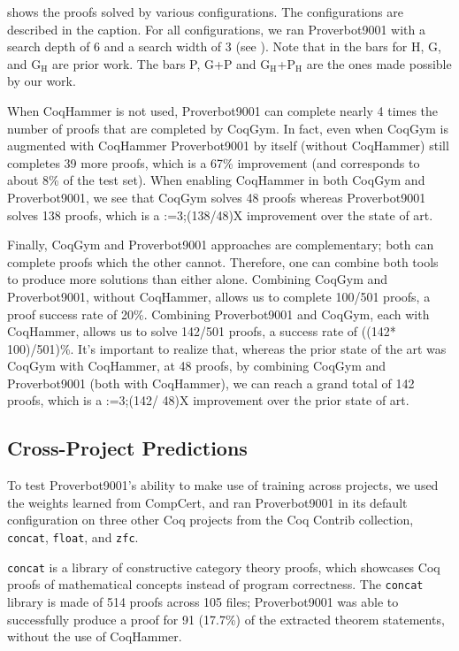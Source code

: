 \documentclass[sigplan,screen]{acmart}
\newcommand{\name}{Proverbot9001\xspace}
\newcommand{\PH}{138}
\newcommand{\CHCP}{142}
\renewcommand{\>}{\quad}
\begin{document}
 shows the proofs solved by various configurations.
The configurations are described in the caption.
For all configurations,
  we ran \name{} with a search depth of 6 and a search width of 3
  (see ).
Note that in  the bars for H, G, and $\text{G}_\text{H}$ are prior work.
The bars P, G+P and $\text{G}_\text{H}$+$\text{P}_\text{H}$
  are the ones made possible by our work.

When CoqHammer is not used, \name{} can complete nearly 4 times the number of proofs
  that are completed by CoqGym.
In fact, even when CoqGym is augmented with CoqHammer
  \name{} by itself (without CoqHammer) still completes 39 more proofs,
  which is a 67\% improvement (and corresponds to about 8\% of the test set).
When enabling CoqHammer in both CoqGym and \name{}, we see that CoqGym solves 48 proofs whereas \name{} solves \PH{} proofs, which is a \xintDigits:=3;\xintthefloatexpr(\PH/48)\relax X improvement over the state of art.

Finally, CoqGym and \name{} approaches are complementary;
  both can complete proofs which the other cannot.
Therefore, one can combine both tools to produce
  more solutions than either alone.
Combining CoqGym and \name{}, without CoqHammer, allows us to complete 100/501 proofs,
  a proof success rate of 20\%.
Combining \name{} and CoqGym, each with CoqHammer,
  allows us to solve \CHCP{}/501 proofs, a success rate of \number\numexpr((\CHCP * 100)/501)\relax\%.
It's important to realize that,
  whereas the prior state of the art was CoqGym with CoqHammer, at 48 proofs,
  by combining CoqGym and \name{} (both with CoqHammer),
  we can reach a grand total of \CHCP\xspace proofs,
  which is a \xintDigits:=3;\xintthefloatexpr(\CHCP / 48)\relax X improvement
  over the prior state of art.

\subsection{Cross-Project Predictions}
\label{ssec:cross}

To test Proverbot9001's ability to make use of training across projects,
  we used the weights learned from CompCert,
  and ran Proverbot9001 in its default configuration
  on three other Coq projects from the Coq Contrib collection,
  \texttt{concat}, \texttt{float}, and \texttt{zfc}.

\texttt{concat} is a library of constructive category theory proofs,
  which showcases Coq proofs of mathematical concepts instead of program correctness.
The \texttt{concat} library is made of 514 proofs across 105 files;
Proverbot9001 was able to successfully produce a proof for 91 (17.7\%)
  of the extracted theorem statements,
  without the use of CoqHammer.
\end{document}

